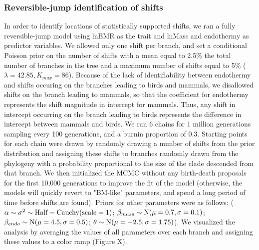 \documentclass[a4paper,11pt]{article}
\begin{document}
\subsubsection*{Reversible-jump identification of shifts}
In order to identify locations of statistically supported shifts, we ran a fully reversible-jump model using lnBMR as the trait and lnMass and endothermy as predictor variables. We allowed only one shift per branch, and set a conditional Poisson prior on the number of shifts with a mean equal to 2.5\% the total number of branches in the tree and a maximum number of shifts equal to 5\% ($\lambda = 42.85, K_{max} = 86$). Because of the lack of identifiability between endothermy and shifts occuring on the branches leading to birds and mammals, we disallowed shifts on the branch leading to mammals, so that the coefficient for endothermy represents the shift magnitude in intercept for mammals. Thus, any shift in intercept occurring on the branch leading to birds represents the difference in intercept between mammals and birds. We ran 6 chains for 1 million generations sampling every 100 generations, and a burnin proportion of 0.3. Starting points for each chain were drawn by randomly drawing a number of shifts from the prior distribution and assigning these shifts to branches randomly drawn from the phylogeny with a probability proportional to the size of the clade descended from that branch. We then initialized the MCMC without any birth-death proposals for the first 10,000 generations to improve the fit of the model (otherwise, the models will quickly revert to "BM-like" parameters, and spend a long period of time before shifts are found). Priors for other parameters were as follows: ($\alpha \sim \sigma^2 \sim \rm{Half-Cauchy}(\rm{scale}=1)$; $\beta_{mass} \sim \rm{N}(\mu = 0.7, \sigma=0.1)$; $\beta_{endo} \sim \rm{N}(\mu=4.5, \sigma=0.5)$; $\theta \sim \rm{N}(\mu=-2.5, \sigma=1.75)$). We visualized the analysis by averaging the values of all parameters over each branch and assigning these values to a color ramp (Figure X). \\
\end{document}
